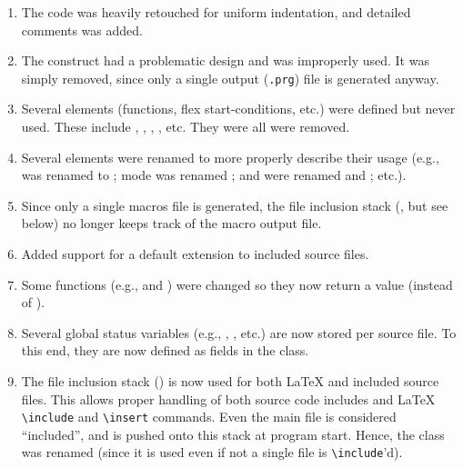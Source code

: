 \documentclass[twoside,12pt]{article}
\newcommand{\bs}{\textbackslash}
\begin{document}
\begin{enumerate}

\item
The code was heavily retouched for uniform indentation, and detailed comments
    was added.

\item
The \PROGbb{} construct had a problematic design and was improperly used.
    It was simply removed, since only a single output (\texttt{.prg}) file
    is generated anyway.

\item
Several elements (functions, flex start-conditions, etc.) were defined but never
    used. These include \PROGbc{}, \PROGbd{}, \PROGbe{}, \PROGbf{},
    etc. They were all were removed.

\item
Several elements were renamed to more properly describe their usage (e.g., \PROGbg{} was
    renamed to \PROGbh{}; \PROGbi{} mode was renamed \PROGbj{};
    \PROGca{} and \PROGcb{} were renamed \PROGcc{} and \PROGcd{}; etc.).

\item
Since only a single macros file is generated, the file inclusion stack (\PROGce{},
    but see below) no longer keeps track of the macro output file.

\item
Added support for a default extension to included source files.

\item
Some functions (e.g., \PROGcf{} and \PROGcg{}) were changed so they now
    return a \PROGch{} value (instead of \PROGci{}).

\item
Several global status variables (e.g., \PROGcj{}, \PROGda{}, etc.) are now stored
    per source file. To this end, they are now defined as fields in the
    \PROGdb{} class.

\item
The file inclusion stack (\PROGdc{}) is now used for both \LaTeX{} and included
    source files. This allows proper handling of both source code includes and
    \LaTeX{} \texttt{\bs{}include} and \texttt{\bs{}insert}
    commands. Even the main file is considered ``included'', and is
    pushed onto this stack at program start. Hence, the class was renamed
    \PROGdd{} (since it is used even if not a single file is
    \texttt{\bs{}include}'d).

\end{enumerate}
\end{document}
